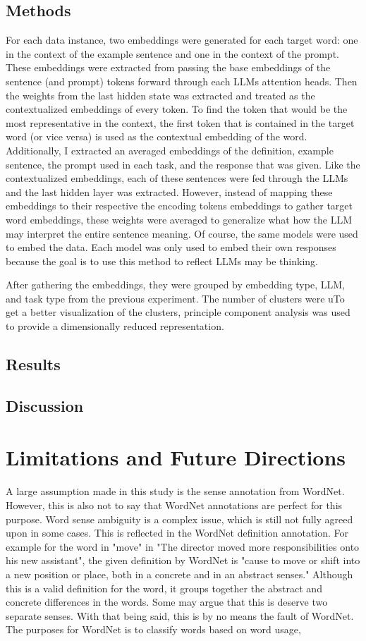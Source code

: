 \documentclass{brandeis-thesis3.2}
\theoremstyle{plain}
\theoremstyle{definition}
\theoremstyle{remark}
\numberwithin{equation}{section}
\begin{document}
\section{Methods}
For each data instance, two embeddings were generated for each target word: one in the context of the example sentence and one in the context of the prompt. These embeddings were extracted from passing the base embeddings of the sentence (and prompt) tokens forward through each LLMs attention heads. Then the weights from the last hidden state was extracted and treated as the contextualized embeddings of every token. To find the token that would be the most representative in the context, the first token that is contained in the target word (or vice versa) is used as the contextual embedding of the word. Additionally, I extracted an averaged embeddings of the definition, example sentence, the prompt used in each task, and the response that was given. Like the contextualized embeddings, each of these sentences were fed through the LLMs and the last hidden layer was extracted. However, instead of mapping these embeddings to their respective the encoding tokens embeddings to gather target word embeddings, these weights were averaged to generalize what how the LLM may interpret the entire sentence meaning. Of course, the same models were used to embed the data. Each model was only used to embed their own responses because the goal is to use this method to reflect LLMs may be thinking.

After gathering the embeddings, they were grouped by embedding type, LLM, and task type from the previous experiment. The number of clusters were uTo get a better visualization of the clusters, principle component analysis was used to provide a dimensionally reduced representation. 

\section{Results}

\section{Discussion}


\chapter{Limitations and Future Directions}
A large assumption made in this study is the sense annotation from WordNet. However, this is also not to say that WordNet annotations are perfect for this purpose. Word sense ambiguity is a complex issue, which is still not fully agreed upon in some cases. This is reflected in the WordNet definition annotation. For example for the word in "move" in "The director moved more responsibilities onto his new assistant", the given definition by WordNet is "cause to move or shift into a new position or place, both in a concrete and in an abstract senses." Although this is a valid definition for the word, it groups together the abstract and concrete differences in the words. Some may argue that this is deserve two separate senses.  With that being said, this is by no means the fault of WordNet. The purposes for WordNet is to classify words based on word usage, 
\end{document}
